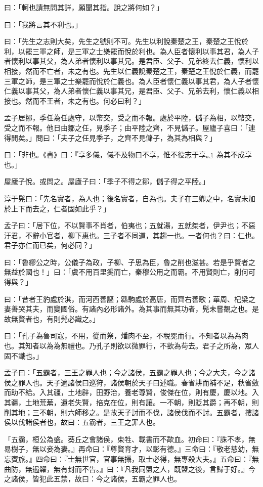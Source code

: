 \documentclass[12pt,a4paper]{ctexbook}
\begin{document}
曰：「軻也請無問其詳，願聞其指。說之將何如？」\par
曰：「我將言其不利也。」\par
曰：「先生之志則大矣，先生之號則不可。先生以利說秦楚之王，秦楚之王悅於利，以罷三軍之師，是三軍之士樂罷而悅於利也。為人臣者懷利以事其君，為人子者懷利以事其父，為人弟者懷利以事其兄。是君臣、父子、兄弟終去仁義，懷利以相接，然而不亡者，未之有也。先生以仁義說秦楚之王，秦楚之王悅於仁義，而罷三軍之師，是三軍之士樂罷而悅於仁義也。為人臣者懷仁義以事其君，為人子者懷仁義以事其父，為人弟者懷仁義以事其兄，是君臣、父子、兄弟去利，懷仁義以相接也。然而不王者，未之有也。何必曰利？」\par
孟子居鄒，季任為任處守，以幣交，受之而不報。處於平陸，儲子為相，以幣交，受之而不報。他日由鄒之任，見季子；由平陸之齊，不見儲子。屋廬子喜曰：「連得閒矣。」問曰：「夫子之任見季子，之齊不見儲子，為其為相與？」\par
曰：「非也。《書》曰：『享多儀，儀不及物曰不享，惟不役志于享。』為其不成享也。」\par
屋廬子悅。或問之。屋廬子曰：「季子不得之鄒，儲子得之平陸。」\par
淳于髡曰：「先名實者，為人也；後名實者，自為也。夫子在三卿之中，名實未加於上下而去之，仁者固如此乎？」\par
孟子曰：「居下位，不以賢事不肖者，伯夷也；五就湯，五就桀者，伊尹也；不惡汙君，不辭小官者，柳下惠也。三子者不同道，其趨一也。一者何也？曰：仁也。君子亦仁而已矣，何必同？」\par
曰：「魯繆公之時，公儀子為政，子柳、子思為臣，魯之削也滋甚。若是乎賢者之無益於國也！」曰：「虞不用百里奚而亡，秦穆公用之而霸。不用賢則亡，削何可得與？」\par
曰：「昔者王豹處於淇，而河西善謳；緜駒處於高唐，而齊右善歌；華周、杞梁之妻善哭其夫，而變國俗。有諸內必形諸外。為其事而無其功者，髡未嘗覩之也。是故無賢者也，有則髡必識之。」\par
曰：「孔子為魯司寇，不用，從而祭，燔肉不至，不稅冕而行。不知者以為為肉也。其知者以為為無禮也。乃孔子則欲以微罪行，不欲為苟去。君子之所為，眾人固不識也。」\par
孟子曰：「五霸者，三王之罪人也；今之諸侯，五霸之罪人也；今之大夫，今之諸侯之罪人也。天子適諸侯曰巡狩，諸侯朝於天子曰述職。春省耕而補不足，秋省斂而助不給。入其疆，土地辟，田野治，養老尊賢，俊傑在位，則有慶，慶以地。入其疆，土地荒蕪，遺老失賢，掊克在位，則有讓。一不朝，則貶其爵；再不朝，則削其地；三不朝，則六師移之。是故天子討而不伐，諸侯伐而不討。五霸者，摟諸侯以伐諸侯者也，故曰：五霸者，三王之罪人也。\par
「五霸，桓公為盛。葵丘之會諸侯，束牲、載書而不歃血。初命曰：『誅不孝，無易樹子，無以妾為妻。』再命曰：『尊賢育才，以彰有德。』三命曰：『敬老慈幼，無忘賓旅。』四命曰：『士無世官，官事無攝，取士必得，無專殺大夫。』五命曰：『無曲防，無遏糴，無有封而不告。』曰：『凡我同盟之人，既盟之後，言歸于好。』今之諸侯，皆犯此五禁，故曰：今之諸侯，五霸之罪人也。\par
\end{document}
